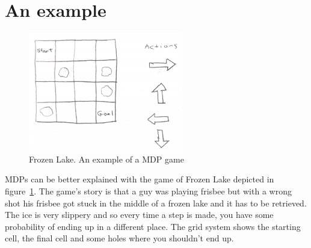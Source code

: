 \section{An example}

\begin{figure}[ht]
    \centering
    \includegraphics[width=0.6\textwidth]{./pictures/frozenlake.eps}
    \caption{Frozen Lake. An example of a MDP game~\cite{DeepRLCourse}}
    \label{fig:frozenlake}
\end{figure}

MDPs can be better explained with the game of Frozen Lake depicted in figure~\ref{fig:frozenlake}. The game's story is that a guy was playing frisbee but with a wrong shot his frisbee got stuck in the middle of a frozen lake and it has to be retrieved. The ice is very slippery and so every time a step is made, you have some probability of ending up in a different place. The grid system shows the starting cell, the final cell and some holes where you shouldn't end up.

